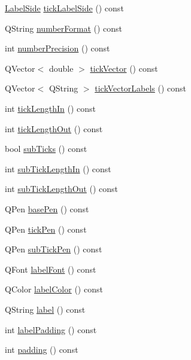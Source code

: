 \begin{DoxyCompactItemize}
\item 
\hyperlink{class_q_c_p_axis_a24b13374b9b8f75f47eed2ea78c37db9}{Label\+Side} \hyperlink{class_q_c_p_axis_a1dc21783965a7c7d9c29c2a75d0a54e1}{tick\+Label\+Side} () const
\item 
Q\+String \hyperlink{class_q_c_p_axis_a20cc29c2f282a0e9efd8f32145e47be6}{number\+Format} () const
\item 
int \hyperlink{class_q_c_p_axis_a2562b6f3a4a01c7ed83a388042664998}{number\+Precision} () const
\item 
Q\+Vector$<$ double $>$ \hyperlink{class_q_c_p_axis_a5aad9d6b34821ab0751dfc38dbc92a46}{tick\+Vector} () const
\item 
Q\+Vector$<$ Q\+String $>$ \hyperlink{class_q_c_p_axis_a1bd4a9036e0c9fc68b6f3df81f07e55f}{tick\+Vector\+Labels} () const
\item 
int \hyperlink{class_q_c_p_axis_ace2accb350fd3f3f474280f58c1d61c5}{tick\+Length\+In} () const
\item 
int \hyperlink{class_q_c_p_axis_ad3ba6614ccddf351f133e0acdd4f021e}{tick\+Length\+Out} () const
\item 
bool \hyperlink{class_q_c_p_axis_ad74153c38fd83b54c509cff249370beb}{sub\+Ticks} () const
\item 
int \hyperlink{class_q_c_p_axis_af907c8ecc4624d1bf4a8f6f702e64fbe}{sub\+Tick\+Length\+In} () const
\item 
int \hyperlink{class_q_c_p_axis_ac98c66cae50c98f3ae90e2969382976d}{sub\+Tick\+Length\+Out} () const
\item 
Q\+Pen \hyperlink{class_q_c_p_axis_a216974be018e73008b3cf6d033c1325d}{base\+Pen} () const
\item 
Q\+Pen \hyperlink{class_q_c_p_axis_affd022d4f56dfc575b4ced95ad417860}{tick\+Pen} () const
\item 
Q\+Pen \hyperlink{class_q_c_p_axis_a7a89df74ba427fac311bf4cc92fbddca}{sub\+Tick\+Pen} () const
\item 
Q\+Font \hyperlink{class_q_c_p_axis_aa7b465fe233f1878793954ba5ab9c47e}{label\+Font} () const
\item 
Q\+Color \hyperlink{class_q_c_p_axis_a05794f13d322da7fd9d5554d11186b0e}{label\+Color} () const
\item 
Q\+String \hyperlink{class_q_c_p_axis_a32ba4d3effcddd8af3bc49f405e1d53e}{label} () const
\item 
int \hyperlink{class_q_c_p_axis_a6d9a9fe1c7166f209fb1e25686390451}{label\+Padding} () const
\item 
int \hyperlink{class_q_c_p_axis_a07df379d5c017b8f3a4702532eb037b2}{padding} () const

\end{DoxyCompactItemize}
